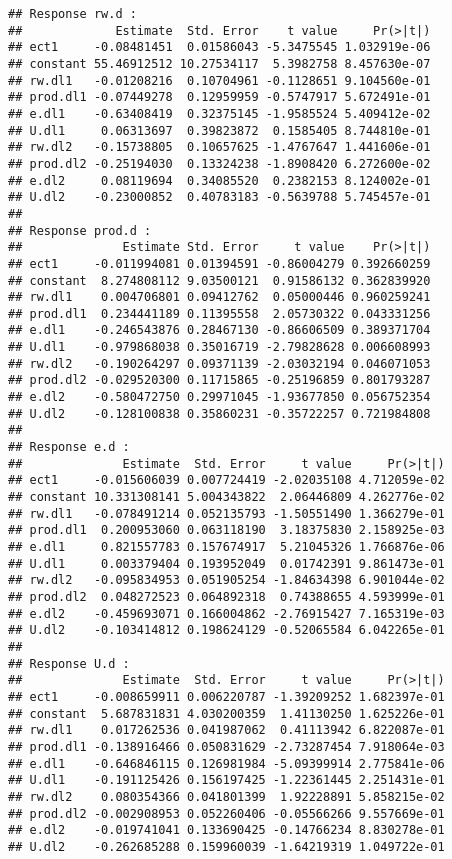 \documentclass[]{book}
\theoremstyle{definition}
\theoremstyle{definition}
\theoremstyle{definition}
\theoremstyle{remark}
\begin{document}
\begin{verbatim}
## Response rw.d :
##             Estimate  Std. Error    t value     Pr(>|t|)
## ect1     -0.08481451  0.01586043 -5.3475545 1.032919e-06
## constant 55.46912512 10.27534117  5.3982758 8.457630e-07
## rw.dl1   -0.01208216  0.10704961 -0.1128651 9.104560e-01
## prod.dl1 -0.07449278  0.12959959 -0.5747917 5.672491e-01
## e.dl1    -0.63408419  0.32375145 -1.9585524 5.409412e-02
## U.dl1     0.06313697  0.39823872  0.1585405 8.744810e-01
## rw.dl2   -0.15738805  0.10657625 -1.4767647 1.441606e-01
## prod.dl2 -0.25194030  0.13324238 -1.8908420 6.272600e-02
## e.dl2     0.08119694  0.34085520  0.2382153 8.124002e-01
## U.dl2    -0.23000852  0.40783183 -0.5639788 5.745457e-01
## 
## Response prod.d :
##              Estimate Std. Error     t value    Pr(>|t|)
## ect1     -0.011994081 0.01394591 -0.86004279 0.392660259
## constant  8.274808112 9.03500121  0.91586132 0.362839920
## rw.dl1    0.004706801 0.09412762  0.05000446 0.960259241
## prod.dl1  0.234441189 0.11395558  2.05730322 0.043331256
## e.dl1    -0.246543876 0.28467130 -0.86606509 0.389371704
## U.dl1    -0.979868038 0.35016719 -2.79828628 0.006608993
## rw.dl2   -0.190264297 0.09371139 -2.03032194 0.046071053
## prod.dl2 -0.029520300 0.11715865 -0.25196859 0.801793287
## e.dl2    -0.580472750 0.29971045 -1.93677850 0.056752354
## U.dl2    -0.128100838 0.35860231 -0.35722257 0.721984808
## 
## Response e.d :
##              Estimate  Std. Error     t value     Pr(>|t|)
## ect1     -0.015606039 0.007724419 -2.02035108 4.712059e-02
## constant 10.331308141 5.004343822  2.06446809 4.262776e-02
## rw.dl1   -0.078491214 0.052135793 -1.50551490 1.366279e-01
## prod.dl1  0.200953060 0.063118190  3.18375830 2.158925e-03
## e.dl1     0.821557783 0.157674917  5.21045326 1.766876e-06
## U.dl1     0.003379404 0.193952049  0.01742391 9.861473e-01
## rw.dl2   -0.095834953 0.051905254 -1.84634398 6.901044e-02
## prod.dl2  0.048272523 0.064892318  0.74388655 4.593999e-01
## e.dl2    -0.459693071 0.166004862 -2.76915427 7.165319e-03
## U.dl2    -0.103414812 0.198624129 -0.52065584 6.042265e-01
## 
## Response U.d :
##              Estimate  Std. Error     t value     Pr(>|t|)
## ect1     -0.008659911 0.006220787 -1.39209252 1.682397e-01
## constant  5.687831831 4.030200359  1.41130250 1.625226e-01
## rw.dl1    0.017262536 0.041987062  0.41113942 6.822087e-01
## prod.dl1 -0.138916466 0.050831629 -2.73287454 7.918064e-03
## e.dl1    -0.646846115 0.126981984 -5.09399914 2.775841e-06
## U.dl1    -0.191125426 0.156197425 -1.22361445 2.251431e-01
## rw.dl2    0.080354366 0.041801399  1.92228891 5.858215e-02
## prod.dl2 -0.002908953 0.052260406 -0.05566266 9.557669e-01
## e.dl2    -0.019741041 0.133690425 -0.14766234 8.830278e-01
## U.dl2    -0.262685288 0.159960039 -1.64219319 1.049722e-01
\end{verbatim}
\end{document}
